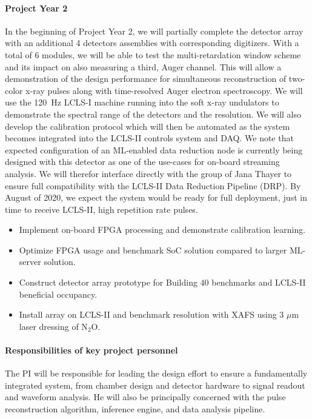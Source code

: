 \paragraph*{Project Year 2}
In the beginning of Project Year 2, we will partially complete the detector array with an additional 4 detectors assemblies with corresponding digitizers.
With a total of 6 modules, we will be able to test the multi-retardation window scheme and its impact on also measuring a third, Auger channel.
This will allow a demonstration of the design performance for simultaneous reconstruction of two-color x-ray pulses along with time-resolved Auger electron spectroscopy.
We will use the 120~Hz LCLS-I machine running into the soft x-ray undulators to demonstrate the spectral range of the detectors and the resolution.  
We will also develop the calibration protocol which will then be automated as the system becomes integrated into the LCLS-II controls system and DAQ.  
We note that expected configuration of an ML-enabled data reduction node is currently being designed with this detector as one of the use-cases for on-board streaming analysis.  
We will therefor interface directly with the group of Jana Thayer to ensure full compatibility with the LCLS-II Data Reduction Pipeline (DRP).  
By August of 2020, we expect the system would be ready for full deployment, just in time to receive LCLS-II, high repetition rate pulses.
\begin{itemize}
\item Implement on-board FPGA processing and demonstrate calibration learning.
\item Optimize FPGA usage and benchmark SoC solution compared to larger ML-server solution.
\item Construct detector array prototype for Building 40 benchmarks and LCLS-II beneficial occupancy.
\item Install array on LCLS-II and benchmark resolution with XAFS using 3 $\mu$m laser dressing of N$_2$O.
\end{itemize}

\paragraph*{Responsibilities of key project personnel}
The PI will be responsible for leading the design effort to ensure a fundamentally integrated system, from chamber design and detector hardware to signal readout and waveform analysis.
He will also be principally concerned with the pulse reconstruction algorithm, inference engine, and data analysis pipeline.

